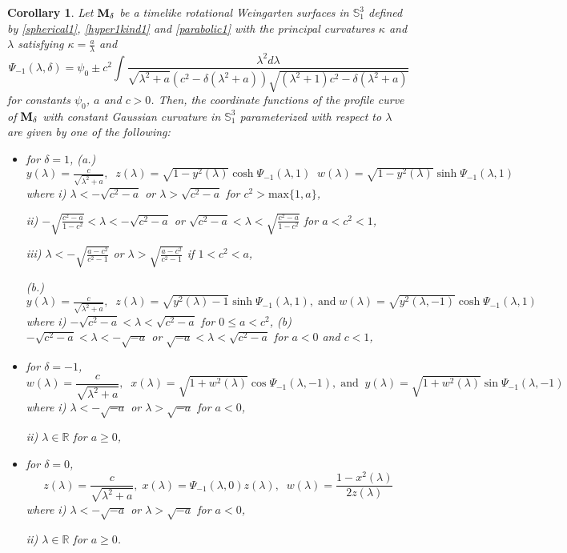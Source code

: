\documentclass{amsart}
\newtheorem{Corollary}[Theorem]{Corollary}
\theoremstyle{definition}
\numberwithin{equation}{section}
\begin{document}
\begin{Corollary}
\label{timelikeWeingarten1}
Let ${\bf M}_\delta$ be a timelike rotational Weingarten surfaces in $\mathbb{S}^3_1$ defined by \eqref{spherical1}, \eqref{hyper1kind1} and 
\eqref{parabolic1} with the principal curvatures $\kappa$ and $\lambda$
satisfying $\kappa=\frac{a}{\lambda}$ and 
\begin{equation}
    \Psi_{-1}(\lambda,\delta)=\psi_0\pm 
    c^2\int{\frac{\lambda^2 d\lambda}{\sqrt{\lambda^2+a}(c^2-\delta(\lambda^2+a))
    \sqrt{(\lambda^2+1)c^2-\delta(\lambda^2+a)}}}
\end{equation}
for constants $\psi_0$, $a$ and $c>0$.
Then, the coordinate functions of the profile curve of ${\bf M}_\delta$ with 
constant Gaussian curvature in $\mathbb{S}^3_1$ parameterized with respect to 
$\lambda$ are given by one of the following:
\begin{itemize}
    \item [1.] for $\delta=1$,
    \subitem (a.) $y(\lambda)=\frac{c}{\sqrt{\lambda^2+a}},\;\;
        z(\lambda)=\sqrt{1-y^2(\lambda)}
        \cosh{\Psi_{-1}(\lambda,1)}\;\;
        w(\lambda)=\sqrt{1-y^2(\lambda)}
        \sinh{\Psi_{-1}(\lambda,1)}$
        where
     \subsubitem i) $\lambda<-\sqrt{c^2-a}$ or $\lambda>\sqrt{c^2-a}$ for $c^2>\mbox{max}\{1,a\}$,
     
     \subsubitem ii) $-\sqrt{\frac{c^2-a}{1-c^2}}<\lambda<-\sqrt{c^2-a}$ or 
     $\sqrt{c^2-a}<\lambda<\sqrt{\frac{c^2-a}{1-c^2}}$ for
     $a<c^2<1$,
     
     \subsubitem iii) 
     $\lambda<-\sqrt{\frac{a-c^2}{c^2-1}}$ or 
     $\lambda>\sqrt{\frac{a-c^2}{c^2-1}}$ if 
     $1<c^2<a$,
    
    \subitem (b.) 
     $y(\lambda)=\frac{c}{\sqrt{\lambda^2+a}},\;\; 
        z(\lambda)=\sqrt{y^2(\lambda)-1}
        \sinh{\Psi_{-1}(\lambda,1)},\;\mbox{and}\;
        w(\lambda)=\sqrt{y^2(\lambda,-1)}
        \cosh{\Psi_{-1}(\lambda,1)}$
        where
        \subsubitem i) $-\sqrt{c^2-a}<\lambda<\sqrt{c^2-a}$ for
        $0\leq a<c^2$,
        \subsubitem (b) $-\sqrt{c^2-a}<\lambda<-\sqrt{-a}$
        or $\sqrt{-a}<\lambda<\sqrt{c^2-a}$
        for $a<0$ and $c<1$,
        
    \item [2.] for $\delta=-1$,
        $$w(\lambda)=\frac{c}{\sqrt{\lambda^2+a}},\;\; 
        x(\lambda)=\sqrt{1+w^2(\lambda)}
        \cos{\Psi_{-1}(\lambda,-1)},\;\mbox{and}\;\;
        y(\lambda)=\sqrt{1+w^2(\lambda)}
        \sin{\Psi_{-1}(\lambda,-1)}$$
       where 
       \subitem i) $\lambda<-\sqrt{-a}$ or $\lambda>\sqrt{-a}$ for $a<0$,
       
       \subitem ii) $\lambda\in\mathbb{R}$ for $a\geq 0$,
        
     \item [3.] for $\delta=0$,
     $$z(\lambda)=\frac{c}{\sqrt{\lambda^2+a}},\;
        x(\lambda)=\Psi_{-1}(\lambda,0)z(\lambda),
        \;\;
        w(\lambda)=\frac{1-x^2(\lambda)}{2z(\lambda)}$$
        where
        \subitem i) $\lambda<-\sqrt{-a}$ or $\lambda>\sqrt{-a}$ for $a<0$,
        
        \subitem ii) $\lambda\in\mathbb{R}$ for $a\geq 0$.
     \end{itemize}
\end{Corollary}
\end{document}
